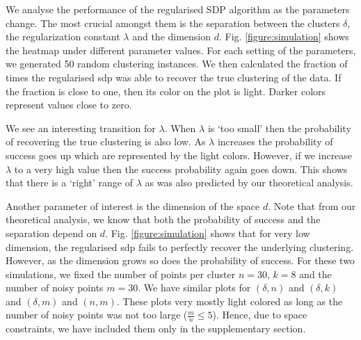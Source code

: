\documentclass[12pt]{article}
\begin{document}
We analyse the performance of the regularised SDP algorithm as the parameters change. The most crucial amongst them is the separation between the clusters $\delta$, the regularization constant $\lambda$ and the dimension $d$. Fig. \ref{figure:simulation} shows the heatmap under different parameter values. For each setting of the parameters, we generated 50 random clustering instances. We then calculated the fraction of times the regularised sdp was able to recover the true clustering of the data. If the fraction is close to one, then its color on the plot is light. Darker colors represent values close to zero.

We see an interesting transition for $\lambda$. When $\lambda$ is `too small' then the probability of recovering the true clustering is also low. As $\lambda$ increases the probability of success goes up which are represented by the light colors. However, if we increase $\lambda$ to a very high value then the success probability again goes down. This shows that there is a `right' range of $\lambda$ as was also predicted by our theoretical analysis. 

Another parameter of interest is the dimension of the space $d$. Note that from our theoretical analysis, we know that both the probability of success and the separation depend on $d$. Fig. \ref{figure:simulation} shows that for very low dimension, the regularised sdp fails to perfectly recover the underlying clustering. However, as the dimension grows so does the probability of success. For these two simulations, we fixed the number of points per cluster $n = 30$, $k = 8$ and the number of noisy points $m = 30$. We have similar plots for $(\delta, n)$ and $(\delta, k)$ and $(\delta, m)$ and $(n, m)$. These plots very mostly light colored as long as the number of noisy points was not too large ($\frac{m}{n} \le 5$). Hence, due to space constraints, we have included them only in the supplementary section.
   
\end{document}
